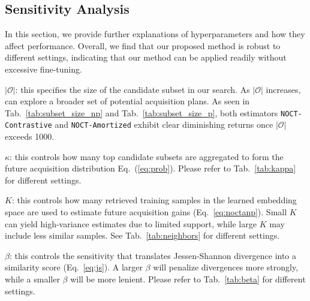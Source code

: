 \subsection{Sensitivity Analysis}
\label{appendex:sensitivity}
In this section, we provide further explanations of hyperparameters and how they affect performance. Overall, we find that our proposed method is robust to different settings, indicating that our method can be applied readily without excessive fine-tuning.



$|\mathcal{O}|$: this specifies the size of the candidate subset in our search. As $|\mathcal{O}|$ increases, \texttt{\OurMethod} can explore a broader set of potential acquisition plans. As seen in Tab.~\ref{tab:subset_size_np} and  Tab.~\ref{tab:subset_size_p}, both estimators \texttt{NOCT-Contrastive} and \texttt{NOCT-Amortized} exhibit clear diminishing returns once $|\mathcal{O}|$ exceeds 1000.

$\kappa$: this controls how many top candidate subsets are aggregated to form the future acquisition distribution Eq.~(\ref{eq:prob}). Please refer to Tab.~\ref{tab:kappa} for different settings. %

$K$: this controls how many retrieved training samples in the learned embedding space are used to estimate future acquisition gains (Eq.~\ref{eq:noctanp}). Small $K$ can yield high-variance estimates due to limited support, while large $K$ may include less similar samples. See Tab.~\ref{tab:neighbors} for different settings.


$\beta$: this controls the sensitivity that translates Jessen-Shannon divergence into a similarity score (Eq.~\ref{eq:js}). A larger $\beta$ will penalize divergences more strongly, while a smaller $\beta$ will be more lenient. Please refer to Tab.~\ref{tab:beta} for different settings. %

